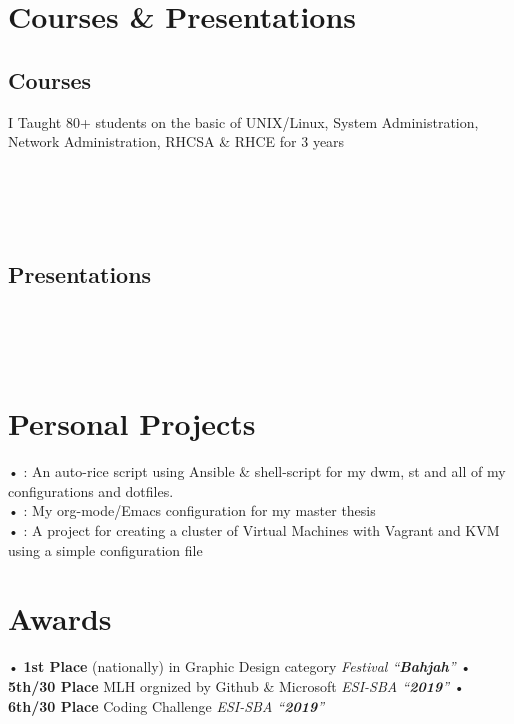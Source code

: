 \documentclass{cv}
\begin{document}
\section{Courses \& Presentations}
\subsection{Courses}
I Taught 80+ students on the basic of UNIX/Linux, System Administration, Network Administration, RHCSA \& RHCE for 3 years\\\\
\\
\\
\\
\subsection{Presentations}
\\
\\
\\

\section{Personal Projects}
      • : An auto-rice script using Ansible \& shell-script for my dwm, st and all of my configurations and dotfiles. \\
      • : My org-mode/Emacs configuration for my master thesis\\
      • : A project for creating a cluster of Virtual Machines with Vagrant and KVM using a simple configuration file

\section{Awards}
  • \textbf{1st Place} (nationally) in  Graphic Design category \emph{Festival ``\textbf{Bahjah}''} 
  • \textbf{5th/30 Place} MLH orgnized by Github \& Microsoft \emph{ESI-SBA ``\textbf{2019}''} 
  • \textbf{6th/30 Place} Coding Challenge \emph{ESI-SBA ``\textbf{2019}''}
\end{document}
